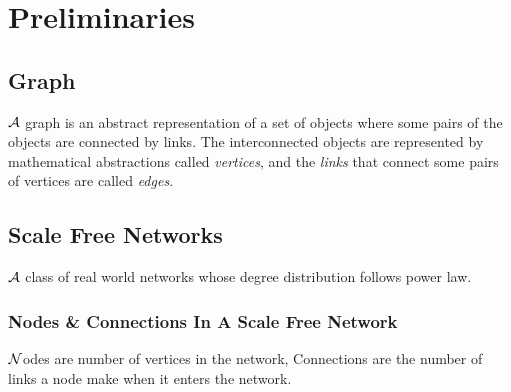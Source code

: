 \documentclass{article}
\begin{document}
\section{Preliminaries}
\subsection{Graph}
\hspace{.18in} $\cal A$ graph is an abstract representation of a set of objects where some pairs of the objects are connected by links. The interconnected objects are represented by mathematical abstractions called \emph{vertices}, and the \emph{links} that connect some pairs of vertices are called \emph{edges}.
\subsection{Scale Free Networks}
\hspace{.18in} $\cal A$ class of real world networks whose degree distribution follows power law\cite{bara1}.
\subsubsection{Nodes \& Connections In A Scale Free Network}
\hspace{.18in}$\cal N$odes are number of vertices in the network, Connections are the number of links a node make when it enters the network.
\end{document}
